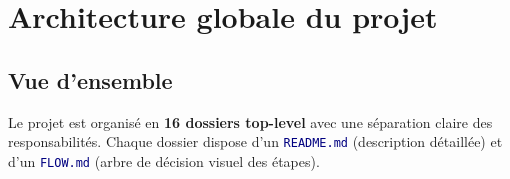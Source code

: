 \documentclass[11pt,a4paper,oneside]{report}
\newcommand{\code}[1]{\texttt{\textcolor{navy}{#1}}}
\begin{document}
\chapter{Architecture globale du projet}

\section{Vue d'ensemble}

Le projet est organisé en \textbf{16 dossiers top-level} avec une séparation claire des responsabilités. Chaque dossier dispose d'un \code{README.md} (description détaillée) et d'un \code{FLOW.md} (arbre de décision visuel des étapes).
\end{document}
